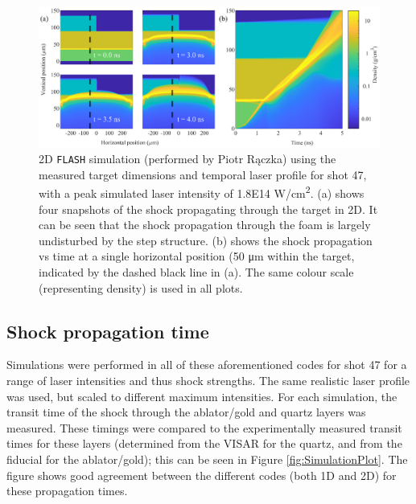 \begin{figure} [h!]
\begin{centering}
\includegraphics[width=1\textwidth]{figures/Experiment/SimSubPlot.eps}%
\caption{\label{fig:SimSubPlot} 2D \texttt{FLASH} simulation (performed by Piotr R\k{a}czka) using the measured target dimensions and temporal laser profile for shot 47, with a peak simulated laser intensity of \num{1.8E14} \si[per-mode=symbol]{W/cm^2}. (a) shows four snapshots of the shock propagating through the target in 2D. It can be seen that the shock propagation through the foam is largely undisturbed by the step structure. (b) shows the shock propagation vs time at a single horizontal position (50 \si[per-mode=symbol]{\micro\meter} within the target, indicated by the dashed black line in (a). The same colour scale (representing density) is used in all plots.}
\end{centering}
\end{figure}

\subsection{Shock propagation time} \label{Shock propagation time}

Simulations were performed in all of these aforementioned codes for shot 47 for a range of laser intensities and thus shock strengths. The same realistic laser profile was used, but scaled to different maximum intensities. For each simulation, the transit time of the shock through the ablator/gold and quartz layers was measured. These timings were compared to the experimentally measured transit times for these layers (determined from the VISAR for the quartz, and from the fiducial for the ablator/gold); this can be seen in Figure \ref{fig:SimulationPlot}. The figure shows good agreement between the different codes (both 1D and 2D) for these propagation times. 

